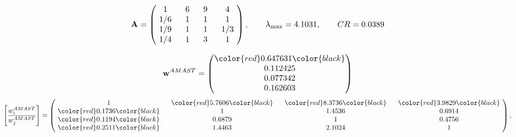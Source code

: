 \begin{example}
\begin{equation*}
\mathbf{A} =
\begin{pmatrix}
$\,\,$ 1 $\,\,$ & $\,\,$6$\,\,$ & $\,\,$9$\,\,$ & $\,\,$4 $\,\,$ \\
$\,\,$ 1/6$\,\,$ & $\,\,$ 1 $\,\,$ & $\,\,$1$\,\,$ & $\,\,$1 $\,\,$ \\
$\,\,$ 1/9$\,\,$ & $\,\,$ 1 $\,\,$ & $\,\,$ 1 $\,\,$ & $\,\,$ 1/3 $\,\,$ \\
$\,\,$ 1/4$\,\,$ & $\,\,$ 1 $\,\,$ & $\,\,$3$\,\,$ & $\,\,$ 1  $\,\,$ \\
\end{pmatrix},
\qquad
\lambda_{\max} =
4.1031,
\qquad
CR = 0.0389
\end{equation*}

\begin{equation*}
\mathbf{w}^{AMAST} =
\begin{pmatrix}
\color{red} 0.647631\color{black} \\
0.112425\\
0.077342\\
0.162603
\end{pmatrix}\end{equation*}
\begin{equation*}
\left[ \frac{{w}^{AMAST}_i}{{w}^{AMAST}_j} \right] =
\begin{pmatrix}
$\,\,$ 1 $\,\,$ & $\,\,$\color{red} 5.7606\color{black} $\,\,$ & $\,\,$\color{red} 8.3736\color{black} $\,\,$ & $\,\,$\color{red} 3.9829\color{black} $\,\,$ \\
$\,\,$\color{red} 0.1736\color{black} $\,\,$ & $\,\,$ 1 $\,\,$ & $\,\,$1.4536$\,\,$ & $\,\,$0.6914  $\,\,$ \\
$\,\,$\color{red} 0.1194\color{black} $\,\,$ & $\,\,$0.6879$\,\,$ & $\,\,$ 1 $\,\,$ & $\,\,$0.4756 $\,\,$ \\
$\,\,$\color{red} 0.2511\color{black} $\,\,$ & $\,\,$1.4463$\,\,$ & $\,\,$2.1024$\,\,$ & $\,\,$ 1  $\,\,$ \\
\end{pmatrix},
\end{equation*}


\end{example}
